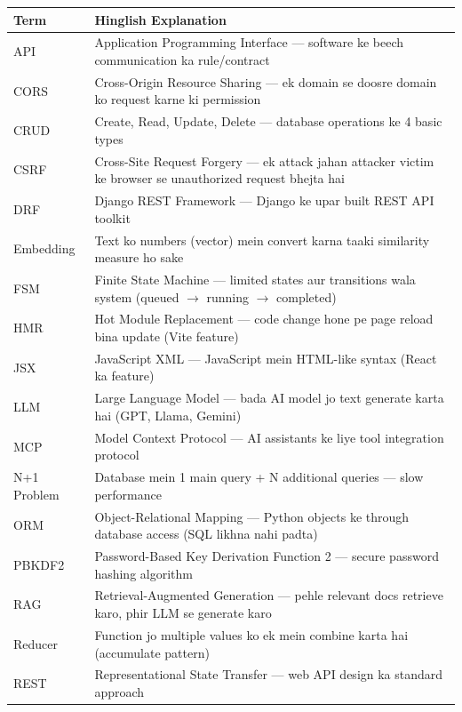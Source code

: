 \documentclass[11pt,a4paper,twoside]{report}
\begin{document}
\begin{longtable}{|p{3.5cm}|p{10cm}|}
\hline
\textbf{Term} & \textbf{Hinglish Explanation} \\
\hline
\endhead
API & Application Programming Interface --- software ke beech communication ka rule/contract \\
\hline
CORS & Cross-Origin Resource Sharing --- ek domain se doosre domain ko request karne ki permission \\
\hline
CRUD & Create, Read, Update, Delete --- database operations ke 4 basic types \\
\hline
CSRF & Cross-Site Request Forgery --- ek attack jahan attacker victim ke browser se unauthorized request bhejta hai \\
\hline
DRF & Django REST Framework --- Django ke upar built REST API toolkit \\
\hline
Embedding & Text ko numbers (vector) mein convert karna taaki similarity measure ho sake \\
\hline
FSM & Finite State Machine --- limited states aur transitions wala system (queued $\rightarrow$ running $\rightarrow$ completed) \\
\hline
HMR & Hot Module Replacement --- code change hone pe page reload bina update (Vite feature) \\
\hline
JSX & JavaScript XML --- JavaScript mein HTML-like syntax (React ka feature) \\
\hline
LLM & Large Language Model --- bada AI model jo text generate karta hai (GPT, Llama, Gemini) \\
\hline
MCP & Model Context Protocol --- AI assistants ke liye tool integration protocol \\
\hline
N+1 Problem & Database mein 1 main query + N additional queries --- slow performance \\
\hline
ORM & Object-Relational Mapping --- Python objects ke through database access (SQL likhna nahi padta) \\
\hline
PBKDF2 & Password-Based Key Derivation Function 2 --- secure password hashing algorithm \\
\hline
RAG & Retrieval-Augmented Generation --- pehle relevant docs retrieve karo, phir LLM se generate karo \\
\hline
Reducer & Function jo multiple values ko ek mein combine karta hai (accumulate pattern) \\
\hline
REST & Representational State Transfer --- web API design ka standard approach \\
\hline

\end{longtable}
\end{document}
